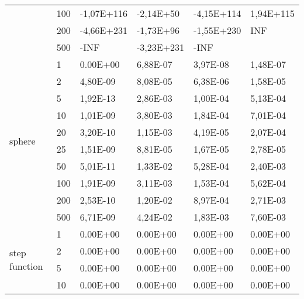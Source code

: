 \begin{longtable}[c]{|p{3.5cm}|l|l|l|l|l|}
                                        & 100       & -1,07E+116 & -2,14E+50  & -4,15E+114 & 1,94E+115 \\ \cline{2-6} 
                                        & 200       & -4,66E+231 & -1,73E+96  & -1,55E+230 & INF       \\ \cline{2-6} 
                                        & 500       & -INF       & -3,23E+231 & -INF       &           \\ \hline
\multirow[t]{10}{*}{sphere}                & 1         & 0.00E+00   & 6,88E-07   & 3,97E-08   & 1,48E-07  \\ \cline{2-6} 
                                        & 2         & 4,80E-09   & 8,08E-05   & 6,38E-06   & 1,58E-05  \\ \cline{2-6} 
                                        & 5         & 1,92E-13   & 2,86E-03   & 1,00E-04   & 5,13E-04  \\ \cline{2-6} 
                                        & 10        & 1,01E-09   & 3,80E-03   & 1,84E-04   & 7,01E-04  \\ \cline{2-6} 
                                        & 20        & 3,20E-10   & 1,15E-03   & 4,19E-05   & 2,07E-04  \\ \cline{2-6} 
                                        & 25        & 1,51E-09   & 8,81E-05   & 1,67E-05   & 2,78E-05  \\ \cline{2-6} 
                                        & 50        & 5,01E-11   & 1,33E-02   & 5,28E-04   & 2,40E-03  \\ \cline{2-6} 
                                        & 100       & 1,91E-09   & 3,11E-03   & 1,53E-04   & 5,62E-04  \\ \cline{2-6} 
                                        & 200       & 2,53E-10   & 1,20E-02   & 8,97E-04   & 2,71E-03  \\ \cline{2-6} 
                                        & 500       & 6,71E-09   & 4,24E-02   & 1,83E-03   & 7,60E-03  \\ \hline
\multirow[t]{10}{*}{step function}         & 1         & 0.00E+00   & 0.00E+00   & 0.00E+00   & 0.00E+00  \\ \cline{2-6} 
                                        & 2         & 0.00E+00   & 0.00E+00   & 0.00E+00   & 0.00E+00  \\ \cline{2-6} 
                                        & 5         & 0.00E+00   & 0.00E+00   & 0.00E+00   & 0.00E+00  \\ \cline{2-6} 
                                        & 10        & 0.00E+00   & 0.00E+00   & 0.00E+00   & 0.00E+00  \\ \cline{2-6} 

\end{longtable}
